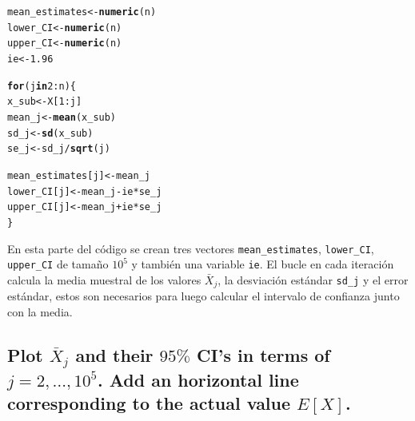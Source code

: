 \documentclass[12pt]{article}\usepackage[]{graphicx}\usepackage[]{xcolor}
\makeatletter
\newcommand{\hlnum}[1]{\textcolor[rgb]{0.686,0.059,0.569}{#1}}%
\newcommand{\hlopt}[1]{\textcolor[rgb]{0,0,0}{#1}}%
\newcommand{\hldef}[1]{\textcolor[rgb]{0.345,0.345,0.345}{#1}}%
\newcommand{\hlkwa}[1]{\textcolor[rgb]{0.161,0.373,0.58}{\textbf{#1}}}%
\newcommand{\hlkwb}[1]{\textcolor[rgb]{0.69,0.353,0.396}{#1}}%
\newcommand{\hlkwd}[1]{\textcolor[rgb]{0.737,0.353,0.396}{\textbf{#1}}}%
\newenvironment{kframe}{%
 \def\at@end@of@kframe{}%
 \ifinner\ifhmode%
  \def\at@end@of@kframe{\end{minipage}}%
  \begin{minipage}{\columnwidth}%
 \fi\fi%
 \def\FrameCommand##1{\hskip\@totalleftmargin \hskip-\fboxsep
 \colorbox{shadecolor}{##1}\hskip-\fboxsep
     \hskip-\linewidth \hskip-\@totalleftmargin \hskip\columnwidth}%
 \MakeFramed {\advance\hsize-\width
   \@totalleftmargin\z@ \linewidth\hsize
   \@setminipage}}%
 {\par\unskip\endMakeFramed%
 \at@end@of@kframe}
\newenvironment{knitrout}{}{} %
\makeatother
\begin{document}
\begin{knitrout}
\color{fgcolor}\begin{kframe}
\begin{alltt}
\hldef{mean_estimates} \hlkwb{<-} \hlkwd{numeric}\hldef{(n)}
\hldef{lower_CI} \hlkwb{<-} \hlkwd{numeric}\hldef{(n)}
\hldef{upper_CI} \hlkwb{<-} \hlkwd{numeric}\hldef{(n)}
\hldef{ie} \hlkwb{<-} \hlnum{1.96}

\hlkwa{for} \hldef{(j} \hlkwa{in} \hlnum{2}\hlopt{:}\hldef{n) \{}
  \hldef{x_sub} \hlkwb{<-} \hldef{X[}\hlnum{1}\hlopt{:}\hldef{j]}
  \hldef{mean_j} \hlkwb{<-} \hlkwd{mean}\hldef{(x_sub)}
  \hldef{sd_j} \hlkwb{<-} \hlkwd{sd}\hldef{(x_sub)}
  \hldef{se_j} \hlkwb{<-} \hldef{sd_j} \hlopt{/} \hlkwd{sqrt}\hldef{(j)}

  \hldef{mean_estimates[j]} \hlkwb{<-} \hldef{mean_j}
  \hldef{lower_CI[j]} \hlkwb{<-} \hldef{mean_j} \hlopt{-} \hldef{ie} \hlopt{*} \hldef{se_j}
  \hldef{upper_CI[j]} \hlkwb{<-} \hldef{mean_j} \hlopt{+} \hldef{ie} \hlopt{*} \hldef{se_j}
\hldef{\}}
\end{alltt}
\end{kframe}
\end{knitrout}

En esta parte del código se crean tres vectores \lstinline|mean_estimates|, \lstinline|lower_CI|, \lstinline|upper_CI| de tamaño $10^{5}$ y también una variable \lstinline|ie|. El bucle en cada iteración calcula la media muestral de los valores $\bar{X}_{j}$, la desviación estándar \lstinline|sd_j| y el error estándar, estos son necesarios para luego calcular el intervalo de confianza junto con la media.


\subsection{Plot $\bar{X}_{j}$ and their $95 \%$ CI’s in terms of $j = 2, \dots , 10^{5}$. Add an horizontal line corresponding to the actual value $E[X]$.}
\end{document}
